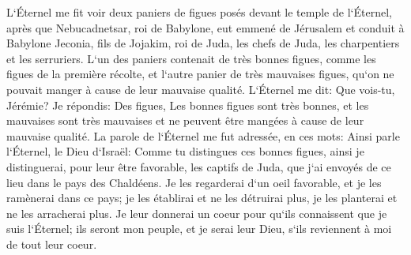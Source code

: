 \verse L`Éternel me fit voir deux paniers de figues posés devant le temple de l`Éternel, après que Nebucadnetsar, roi de Babylone, eut emmené de Jérusalem et conduit à Babylone Jeconia, fils de Jojakim, roi de Juda, les chefs de Juda, les charpentiers et les serruriers. 
\verse L`un des paniers contenait de très bonnes figues, comme les figues de la première récolte, et l`autre panier de très mauvaises figues, qu`on ne pouvait manger à cause de leur mauvaise qualité. 
\verse L`Éternel me dit: Que vois-tu, Jérémie? Je répondis: Des figues, Les bonnes figues sont très bonnes, et les mauvaises sont très mauvaises et ne peuvent être mangées à cause de leur mauvaise qualité. 
\verse La parole de l`Éternel me fut adressée, en ces mots: 
\verse Ainsi parle l`Éternel, le Dieu d`Israël: Comme tu distingues ces bonnes figues, ainsi je distinguerai, pour leur être favorable, les captifs de Juda, que j`ai envoyés de ce lieu dans le pays des Chaldéens. 
\verse Je les regarderai d`un oeil favorable, et je les ramènerai dans ce pays; je les établirai et ne les détruirai plus, je les planterai et ne les arracherai plus. 
\verse Je leur donnerai un coeur pour qu`ils connaissent que je suis l`Éternel; ils seront mon peuple, et je serai leur Dieu, s`ils reviennent à moi de tout leur coeur. 
